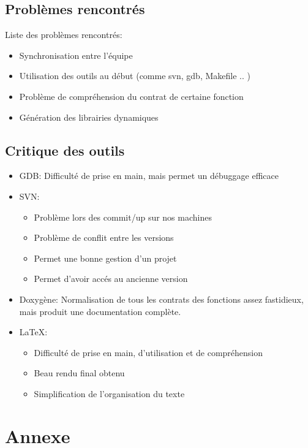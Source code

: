 \documentclass[a4paper]{article}
\begin{document}
 \subsection{Problèmes rencontrés}
 \label{sec-6-2}
 Liste des problèmes rencontrés:
 \begin{itemize}
 \item Synchronisation entre l'équipe
 \item Utilisation des outils au début (comme svn, gdb, Makefile .. )
 \item Problème de compréhension du contrat de certaine fonction
 \item Génération des librairies dynamiques
 \end{itemize}

 \subsection{Critique des outils}
 \label{sec-6-3}
 
 \begin{itemize}
 \item GDB: Difficulté de prise en main, mais permet un débuggage efficace
 \item SVN: 
   \begin{itemize}
   \item Problème lors des commit/up sur nos machines
   \item Problème de conflit entre les versions
   \item Permet une bonne gestion d'un projet
  \item Permet d'avoir accés au ancienne version
  \end{itemize}
  
\item Doxygène: Normalisation de tous les contrats des fonctions assez fastidieux, mais produit une documentation complète.
\item \LaTeX:
  \begin{itemize}
  \item Difficulté de prise en main, d'utilisation et de compréhension
  \item Beau rendu final obtenu
  \item Simplification de l'organisation du texte
  \end{itemize}
\end{itemize}


\newpage

\section{Annexe}
\label{sec-7}
\end{document}
